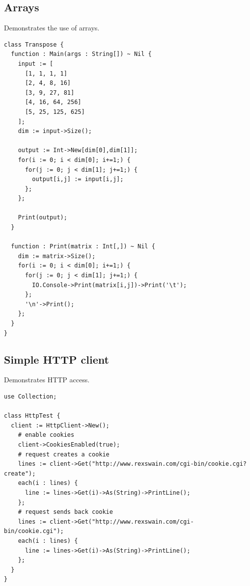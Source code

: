 \documentclass[11pt]{article}
\begin{document}
\subsection{Arrays}
Demonstrates the use of arrays.
\begingroup
\fontsize{8pt}{9pt}\selectfont
\begin{verbatim}
class Transpose {
  function : Main(args : String[]) ~ Nil {
    input := [
      [1, 1, 1, 1]
      [2, 4, 8, 16]
      [3, 9, 27, 81]
      [4, 16, 64, 256]
      [5, 25, 125, 625]
    ];
    dim := input->Size();

    output := Int->New[dim[0],dim[1]];
    for(i := 0; i < dim[0]; i+=1;) {
      for(j := 0; j < dim[1]; j+=1;) {
        output[i,j] := input[i,j];
      };
    };

    Print(output);
  }

  function : Print(matrix : Int[,]) ~ Nil {
    dim := matrix->Size();
    for(i := 0; i < dim[0]; i+=1;) {
      for(j := 0; j < dim[1]; j+=1;) {
        IO.Console->Print(matrix[i,j])->Print('\t');
      };
      '\n'->Print();
    };
  }
}
\end{verbatim}
\endgroup

\subsection{Simple HTTP client}
Demonstrates HTTP access.
\begingroup
\fontsize{8pt}{9pt}\selectfont
\begin{verbatim}
use Collection;

class HttpTest {
  client := HttpClient->New();
    # enable cookies
    client->CookiesEnabled(true);
    # request creates a cookie
    lines := client->Get("http://www.rexswain.com/cgi-bin/cookie.cgi?create");
    each(i : lines) {
      line := lines->Get(i)->As(String)->PrintLine();
    };
    # request sends back cookie
    lines := client->Get("http://www.rexswain.com/cgi-bin/cookie.cgi");
    each(i : lines) {
      line := lines->Get(i)->As(String)->PrintLine();
    };
  }
}
\end{verbatim}
\endgroup
\end{document}
